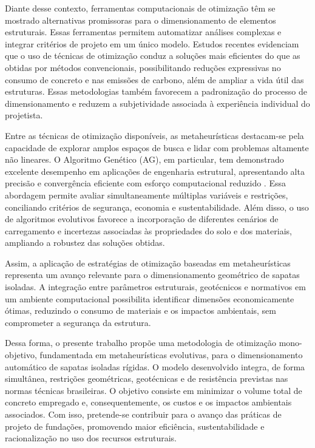 Diante desse contexto, ferramentas computacionais de otimização têm se mostrado alternativas promissoras para o dimensionamento de elementos estruturais. Essas ferramentas permitem automatizar análises complexas e integrar critérios de projeto em um único modelo. Estudos recentes \cite{Mora_et_al, Moraesetal, TRENTINI} evidenciam que o uso de técnicas de otimização conduz a soluções mais eficientes do que as obtidas por métodos convencionais, possibilitando reduções expressivas no consumo de concreto e nas emissões de carbono, além de ampliar a vida útil das estruturas. Essas metodologias também favorecem a padronização do processo de dimensionamento e reduzem a subjetividade associada à experiência individual do projetista.

Entre as técnicas de otimização disponíveis, as metaheurísticas destacam-se pela capacidade de explorar amplos espaços de busca e lidar com problemas altamente não lineares. O Algoritmo Genético (AG), em particular, tem demonstrado excelente desempenho em aplicações de engenharia estrutural, apresentando alta precisão e convergência eficiente com esforço computacional reduzido \cite{DosSantos2013}. Essa abordagem permite avaliar simultaneamente múltiplas variáveis e restrições, conciliando critérios de segurança, economia e sustentabilidade. Além disso, o uso de algoritmos evolutivos favorece a incorporação de diferentes cenários de carregamento e incertezas associadas às propriedades do solo e dos materiais, ampliando a robustez das soluções obtidas.

Assim, a aplicação de estratégias de otimização baseadas em metaheurísticas representa um avanço relevante para o dimensionamento geométrico de sapatas isoladas. A integração entre parâmetros estruturais, geotécnicos e normativos em um ambiente computacional possibilita identificar dimensões economicamente ótimas, reduzindo o consumo de materiais e os impactos ambientais, sem comprometer a segurança da estrutura.

Dessa forma, o presente trabalho propõe uma metodologia de otimização mono-objetivo, fundamentada em metaheurísticas evolutivas, para o dimensionamento automático de sapatas isoladas rígidas. O modelo desenvolvido integra, de forma  simultânea,  restrições geométricas, geotécnicas e de resistência previstas nas normas técnicas brasileiras. O objetivo consiste em minimizar o volume total de concreto empregado e, consequentemente, os custos e os impactos ambientais associados. Com isso, pretende-se contribuir para o avanço das práticas de projeto de fundações, promovendo maior eficiência, sustentabilidade e racionalização no uso dos recursos estruturais.